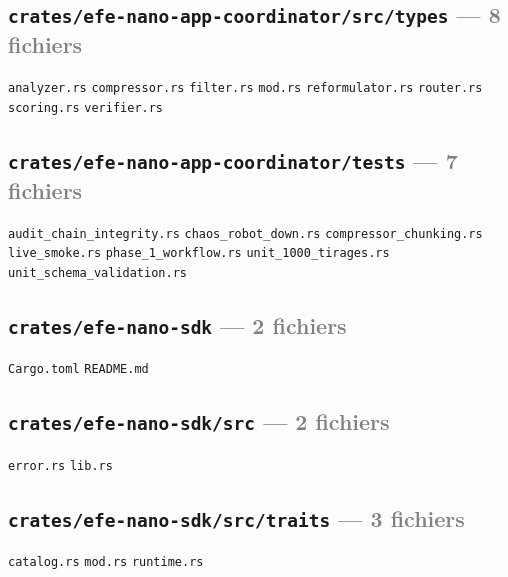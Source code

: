 \documentclass[10pt]{report}
\newcommand{\code}[1]{\texttt{\small #1}}
\begin{document}
\subsection*{\code{crates/efe-nano-app-coordinator/src/types} \normalfont\textcolor{grey}{--- 8 fichiers}}
\begin{sloppypar}\footnotesize\raggedright
\code{analyzer.rs} \;\textbullet\; \code{compressor.rs} \;\textbullet\; \code{filter.rs} \;\textbullet\; \code{mod.rs} \;\textbullet\; \code{reformulator.rs} \;\textbullet\; \code{router.rs} \;\textbullet\; \code{scoring.rs} \;\textbullet\; \code{verifier.rs}
\end{sloppypar}

\subsection*{\code{crates/efe-nano-app-coordinator/tests} \normalfont\textcolor{grey}{--- 7 fichiers}}
\begin{sloppypar}\footnotesize\raggedright
\code{audit\_chain\_integrity.rs} \;\textbullet\; \code{chaos\_robot\_down.rs} \;\textbullet\; \code{compressor\_chunking.rs} \;\textbullet\; \code{live\_smoke.rs} \;\textbullet\; \code{phase\_1\_workflow.rs} \;\textbullet\; \code{unit\_1000\_tirages.rs} \;\textbullet\; \code{unit\_schema\_validation.rs}
\end{sloppypar}

\subsection*{\code{crates/efe-nano-sdk} \normalfont\textcolor{grey}{--- 2 fichiers}}
\begin{sloppypar}\footnotesize\raggedright
\code{Cargo.toml} \;\textbullet\; \code{README.md}
\end{sloppypar}

\subsection*{\code{crates/efe-nano-sdk/src} \normalfont\textcolor{grey}{--- 2 fichiers}}
\begin{sloppypar}\footnotesize\raggedright
\code{error.rs} \;\textbullet\; \code{lib.rs}
\end{sloppypar}

\subsection*{\code{crates/efe-nano-sdk/src/traits} \normalfont\textcolor{grey}{--- 3 fichiers}}
\begin{sloppypar}\footnotesize\raggedright
\code{catalog.rs} \;\textbullet\; \code{mod.rs} \;\textbullet\; \code{runtime.rs}
\end{sloppypar}
\end{document}
